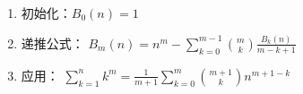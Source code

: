 \begin{enumerate}
	\item 初始化：$B_0(n) = 1$
	\item 递推公式：
	$B_m(n) = n^m - \sum_{k = 0}^{m - 1}\binom{m}{k} \frac{B_k(n)}{m - k + 1}$
	\item 应用：
	$\sum_{k = 1}^{n} k^m = \frac{1}{m + 1}\sum_{k = 0}^{m}\binom{m + 1}{k}n^{m + 1 - k}$
\end{enumerate}
